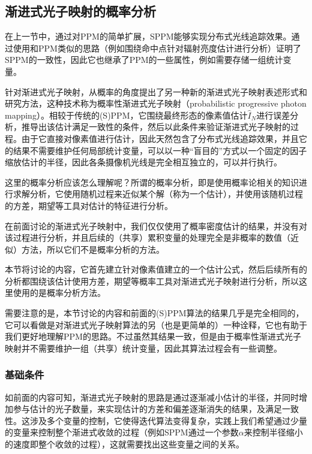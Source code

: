 \subsection{渐进式光子映射的概率分析}\label{sec:pm-probabilistic-ppm}
在上一节中，通过对PPM的简单扩展，SPPM能够实现分布式光线追踪效果。\cite{a:StochasticProgressivePhotonMapping}通过使用和PPM类似的思路（例如围绕命中点针对辐射亮度估计进行分析）证明了SPPM的一致性，因此它也继承了PPM的一些属性，例如需要存储一组统计变量。

针对渐进式光子映射，\cite{a:ProgressivePhotonMappingAProbabilisticApproach}从概率的角度提出了另一种新的渐进式光子映射表述形式和研究方法，这种技术称为概率性渐进式光子映射（probabilistic progressive photon mapping）。相较于传统的(S)PPM，它围绕最终形态的像素值估计$\hat{I}_N$进行误差分析，推导出该估计满足一致性的条件，然后以此条件来验证渐进式光子映射的过程。由于它直接对像素值进行估计，因此天然包含了分布式光线追踪效果，并且它的结果不需要维护任何局部统计变量，可以以一种“盲目的”方式以一个固定的因子缩放估计的半径，因此各条摄像机光线是完全相互独立的，可以并行执行。

\begin{myshaded}
	这里的概率分析应该怎么理解呢？所谓的概率分析，即是使用概率论相关的知识进行求解分析，它使用随机过程来近似某个解（称为一个估计），并使用该随机过程的方差，期望等工具对估计的特征进行分析。
	
	在前面讨论的渐进式光子映射中，我们仅仅使用了概率密度估计的结果，并没有对该过程进行分析，并且后续的（共享）累积变量的处理完全是非概率的数值（近似）方法，所以它们不是概率分析的方法。
	
	本节将讨论的内容，它首先建立针对像素值建立的一个估计公式，然后后续所有的分析都围绕该估计使用方差，期望等概率工具对渐进式光子映射进行分析，所以这里使用的是概率分析方法。
\end{myshaded}

需要注意的是，本节讨论的内容和前面的(S)PPM算法的结果几乎是完全相同的，它可以看做是对渐进式光子映射算法的另（也是更简单的）一种诠释，它也有助于我们更好地理解PPM的思路。不过虽然其结果一致，但是由于概率性渐进式光子映射并不需要维护一组（共享）统计变量，因此其算法过程会有一些调整。




\subsubsection{基础条件}\label{sec:pm-ppm-basis}
如前面的内容可知，渐进式光子映射的思路是通过逐渐减小估计的半径，并同时增加参与估计的光子数量，来实现估计的方差和偏差逐渐消失的结果，及满足一致性。这涉及多个变量的控制，它使得迭代算法变得复杂，实践上我们希望通过少量的变量来控制整个渐进式收敛的过程（例如SPPM通过一个参数$\alpha$来控制半径缩小的速度即整个收敛的过程），这就需要找出这些变量之间的关系。

